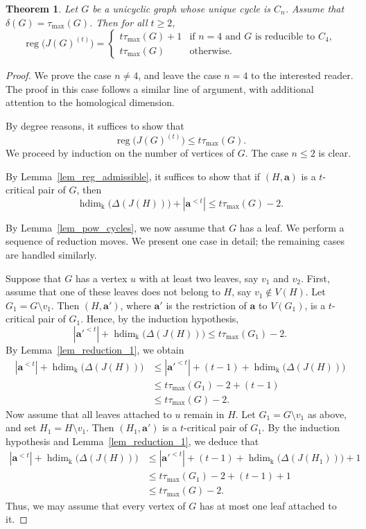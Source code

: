 \documentclass[12pt,amscd]{amsart}
\newtheorem{thm}{Theorem}[section]
\theoremstyle{definition}
\DeclareMathOperator{\hdim}{hdim}
\DeclareMathOperator{\reg}{reg}
\def\a {\mathbf a}
\def\k {\mathrm k}
\begin{document}
\begin{thm}\label{thm_reg_pow_uni}
Let $G$ be a unicyclic graph whose unique cycle is $C_n$. Assume that $\delta(G) = \tau_{\max}(G)$. Then for all $t \ge 2$,
\[
\reg \bigl(J(G)^{(t)}\bigr)
=
\begin{cases}
t \tau_{\max}(G) + 1 & \text{if } n = 4 \text{ and } G \text{ is reducible to } C_4,\\
t \tau_{\max}(G) & \text{otherwise}.
\end{cases}
\]
\end{thm}

\begin{proof}
We prove the case $n \neq 4$, and leave the case $n = 4$ to the interested reader. The proof in this case follows a similar line of argument, with additional attention to the homological dimension.

By degree reasons, it suffices to show that
\[
\reg\bigl(J(G)^{(t)}\bigr) \le t \tau_{\max}(G).
\]
We proceed by induction on the number of vertices of $G$. The case $n \le 2$ is clear.

By Lemma~\ref{lem_reg_admissible}, it suffices to show that if $(H,\a)$ is a $t$-critical pair of $G$, then
\[
\hdim_{\k}\bigl(\Delta(J(H))\bigr) + |\a^{<t}| \le t \tau_{\max}(G) - 2.
\]

By Lemma~\ref{lem_pow_cycles}, we now assume that $G$ has a leaf. We perform a sequence of reduction moves. We present one case in detail; the remaining cases are handled similarly.

Suppose that $G$ has a vertex $u$ with at least two leaves, say $v_1$ and $v_2$. First, assume that one of these leaves does not belong to $H$, say $v_1 \notin V(H)$. Let $G_1 = G \setminus v_1$. Then $(H,\a')$, where $\a'$ is the restriction of $\a$ to $V(G_1)$, is a $t$-critical pair of $G_1$. Hence, by the induction hypothesis,
\[
|\a'^{<t}| + \hdim_\k\bigl(\Delta(J(H))\bigr)
\le
t \tau_{\max}(G_1) - 2.
\]
By Lemma~\ref{lem_reduction_1}, we obtain
\[
\begin{aligned}
|\a^{<t}| + \hdim_\k\bigl(\Delta(J(H))\bigr)
&\le
|\a'^{<t}| + (t-1) + \hdim_\k\bigl(\Delta(J(H))\bigr) \\
&\le
t \tau_{\max}(G_1) - 2 + (t-1) \\
&\le
t \tau_{\max}(G) - 2.
\end{aligned}
\]
Now assume that all leaves attached to $u$ remain in $H$. Let $G_1 = G \setminus v_1$ as above, and set $H_1 = H \setminus v_1$. Then $(H_1,\a')$ is a $t$-critical pair of $G_1$. By the induction hypothesis and Lemma~\ref{lem_reduction_1}, we deduce that
\[
\begin{aligned}
|\a^{<t}| + \hdim_\k\bigl(\Delta(J(H))\bigr)
&\le
|\a'^{<t}| + (t-1)
+ \hdim_\k\bigl(\Delta(J(H_1))\bigr) + 1 \\
&\le
t \tau_{\max}(G_1) - 2 + (t-1) + 1 \\
&\le
t \tau_{\max}(G) - 2.
\end{aligned}
\]
Thus, we may assume that every vertex of $G$ has at most one leaf attached to it. 


\end{proof}
\end{document}
